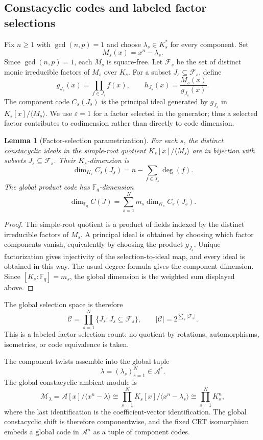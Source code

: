 \documentclass[11pt]{article}
\newcommand{\F}{\mathbb F}
\newcommand{\A}{\mathcal A}
\newcommand{\Fs}{\mathcal F_s}
\theoremstyle{plain}
\newtheorem{lemma}{Lemma}
\theoremstyle{definition}
\theoremstyle{remark}
\begin{document}
\subsection{Constacyclic codes and labeled factor selections}

Fix $n\geq 1$ with $\gcd(n,p)=1$ and choose $\lambda_s\in K_s^*$ for every component. Set
\[
M_s(x)=x^n-\lambda_s.
\]
Since $\gcd(n,p)=1$, each $M_s$ is square-free. Let $\Fs$ be the set of distinct monic irreducible factors of $M_s$ over $K_s$. For a subset $J_s\subseteq\Fs$, define
\[
g_{J_s}(x)=\prod_{f\in J_s}f(x),
\qquad
h_{J_s}(x)=\frac{M_s(x)}{g_{J_s}(x)}.
\]
The component code $C_s(J_s)$ is the principal ideal generated by $g_{J_s}$ in $K_s[x]/\langle M_s\rangle$. We use $\varepsilon=1$ for a factor selected in the generator; thus a selected factor contributes to codimension rather than directly to code dimension.

\begin{lemma}[Factor-selection parametrization]\label{lem:factor-selection}
For each $s$, the distinct constacyclic ideals in the simple-root quotient $K_s[x]/\langle M_s\rangle$ are in bijection with subsets $J_s\subseteq\Fs$. Their $K_s$-dimension is
\[
\dim_{K_s}C_s(J_s)=n-\sum_{f\in J_s}\deg(f).
\]
The global product code has $\F_q$-dimension
\[
\dim_{\F_q}C(J)=\sum_{s=1}^{N}m_s\dim_{K_s}C_s(J_s).
\]
\end{lemma}

\begin{proof}
The simple-root quotient is a product of fields indexed by the distinct irreducible factors of $M_s$. A principal ideal is obtained by choosing which factor components vanish, equivalently by choosing the product $g_{J_s}$. Unique factorization gives injectivity of the selection-to-ideal map, and every ideal is obtained in this way. The usual degree formula gives the component dimension. Since $[K_s:\F_q]=m_s$, the global dimension is the weighted sum displayed above.
\end{proof}

The global selection space is therefore
\[
\mathscr C=\prod_{s=1}^{N}\{J_s:J_s\subseteq\Fs\},
\qquad
|\mathscr C|=2^{\sum_s|\Fs|}.
\]
This is a labeled factor-selection count: no quotient by rotations, automorphisms, isometries, or code equivalence is taken.

The component twists assemble into the global tuple
\[
\lambda=(\lambda_s)_{s=1}^{N}\in\A^*.
\]
The global constacyclic ambient module is
\begin{equation}\label{eq:ambient}
\mathcal M_\lambda
 =\A[x]/\langle x^n-\lambda\rangle
 \cong\prod_{s=1}^{N}K_s[x]/\langle x^n-\lambda_s\rangle
 \cong\prod_{s=1}^{N}K_s^n,
\end{equation}
where the last identification is the coefficient-vector identification. The global constacyclic shift is therefore componentwise, and the fixed CRT isomorphism embeds a global code in $\A^n$ as a tuple of component codes.
\end{document}
